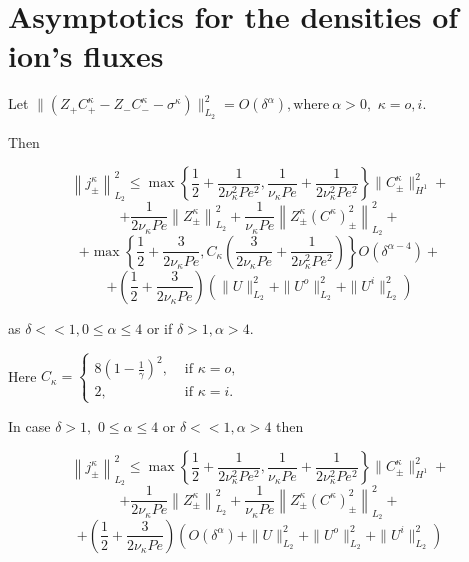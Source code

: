 \documentclass{amsart}
\begin{document}
\section{Asymptotics for the densities of ion's fluxes}

\begin{theorem}\label{j_estimates}
Let  $\|\left(Z_{+}C^{\kappa}_{+}-Z_{-}C^{\kappa}_{-}-\sigma^{\kappa}\right)\|_{L_2}^2=O(\delta^\alpha), \text{where}\  \alpha >0, $  $\kappa=o,i.$

Then 

$$
\left\|j^{\kappa}_{\pm}\right\|^2_{L_2}\leq \max{\left\lbrace\frac{1}{2}+\frac{1}{2\nu_{\kappa}^2Pe^2},\frac{1}{\nu_{\kappa}Pe}+\frac{1}{2\nu_{\kappa}^2Pe^2}\right\rbrace}\|C^{\kappa}_{\pm}\|^2_{H^1}+$$
$$+\frac{1}{2\nu_{\kappa}Pe}\left\|Z^{\kappa}_{\pm}\right\|^2_{L_2}+\frac{1}{\nu_{\kappa}Pe}\left\|Z^{\kappa}_{\pm}(C^{\kappa})^2_{\pm}\right\|^2_{L_2}+ $$
$$+\max{\left\lbrace\frac{1}{2}+\frac{3}{2\nu_{\kappa}Pe},C_{\kappa}\left(\frac{3}{2\nu_{\kappa}Pe}+\frac{1}{2\nu_{\kappa}^2Pe^2}\right)\right\rbrace}O(\delta^{\alpha-4})+
$$
$$+\left(\frac{1}{2}+\frac{3}{2\nu_{\kappa}Pe}\right)\left(\|U\|_{L_2}^2+\|U^o\|_{L_2}^2+\|U^i\|_{L_2}^2\right)$$

as $\delta<<1,0\leq \alpha\leq 4$ or if $\delta>1, \alpha > 4.$

Here 
$C_{\kappa}=\begin{cases}8(1-\frac{1}{\gamma})^2,  & \text{ if } \kappa=o,\\
2, & \text { if } \kappa=i.
\end{cases}$

In case $\delta>1,$  $0\leq \alpha\leq 4$  or  $\delta<<1, \alpha> 4 $ then 

$$
\left\|j^{\kappa}_{\pm}\right\|^2_{L_2}\leq \max{\left\lbrace\frac{1}{2}+\frac{1}{2\nu_{\kappa}^2Pe^2},\frac{1}{\nu_{\kappa}Pe}+\frac{1}{2\nu_{\kappa}^2Pe^2}\right\rbrace}\|C^{\kappa}_{\pm}\|^2_{H^1}+$$
$$+\frac{1}{2\nu_{\kappa}Pe}\left\|Z^{\kappa}_{\pm}\right\|^2_{L_2}+\frac{1}{\nu_{\kappa}Pe}\left\|Z^{\kappa}_{\pm}(C^{\kappa})^2_{\pm}\right\|^2_{L_2}+ $$
$$+\left(\frac{1}{2}+\frac{3}{2\nu_{\kappa}Pe}\right)\left(O(\delta^{\alpha})+\|U\|_{L_2}^2+\|U^o\|_{L_2}^2+\|U^i\|_{L_2}^2\right)$$


\end{theorem}
\end{document}
